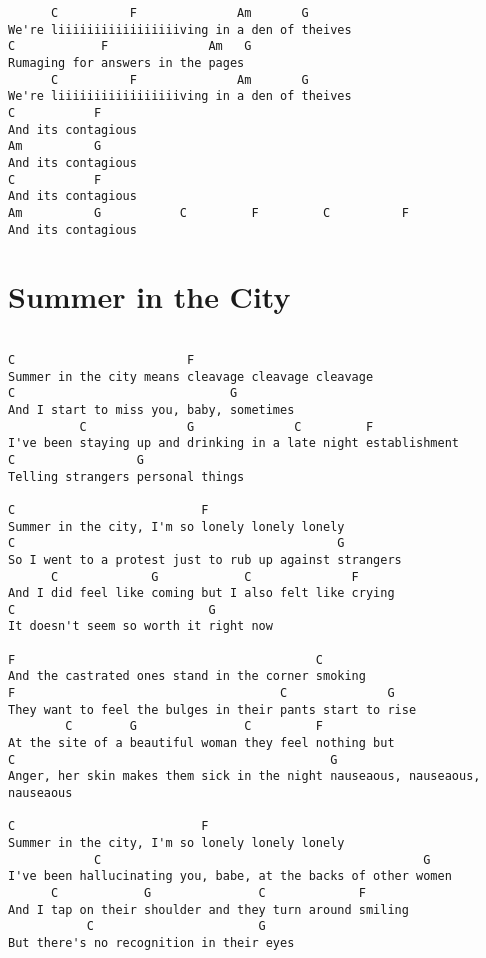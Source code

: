 \documentclass[leqno]{memoir}
\begin{document}
\begin{verbatim}
      C          F              Am       G
We're liiiiiiiiiiiiiiiiiving in a den of theives
C            F              Am   G
Rumaging for answers in the pages
      C          F              Am       G
We're liiiiiiiiiiiiiiiiiving in a den of theives
C           F
And its contagious
Am          G
And its contagious
C           F
And its contagious
Am          G           C         F         C          F
And its contagious
\end{verbatim}
\newpage


\chapter{Summer in the City}
\begin{verbatim}

C                        F
Summer in the city means cleavage cleavage cleavage
C                              G
And I start to miss you, baby, sometimes          
          C              G              C         F
I've been staying up and drinking in a late night establishment
C                 G
Telling strangers personal things

C                          F
Summer in the city, I'm so lonely lonely lonely
C                                             G
So I went to a protest just to rub up against strangers
      C             G            C              F
And I did feel like coming but I also felt like crying
C                           G
It doesn't seem so worth it right now

F                                          C
And the castrated ones stand in the corner smoking
F                                     C              G
They want to feel the bulges in their pants start to rise
        C        G               C         F
At the site of a beautiful woman they feel nothing but
C                                            G
Anger, her skin makes them sick in the night nauseaous, nauseaous, nauseaous

C                          F
Summer in the city, I'm so lonely lonely lonely
            C                                             G
I've been hallucinating you, babe, at the backs of other women
      C            G               C             F
And I tap on their shoulder and they turn around smiling
           C                       G
But there's no recognition in their eyes









\end{verbatim}
\end{document}
